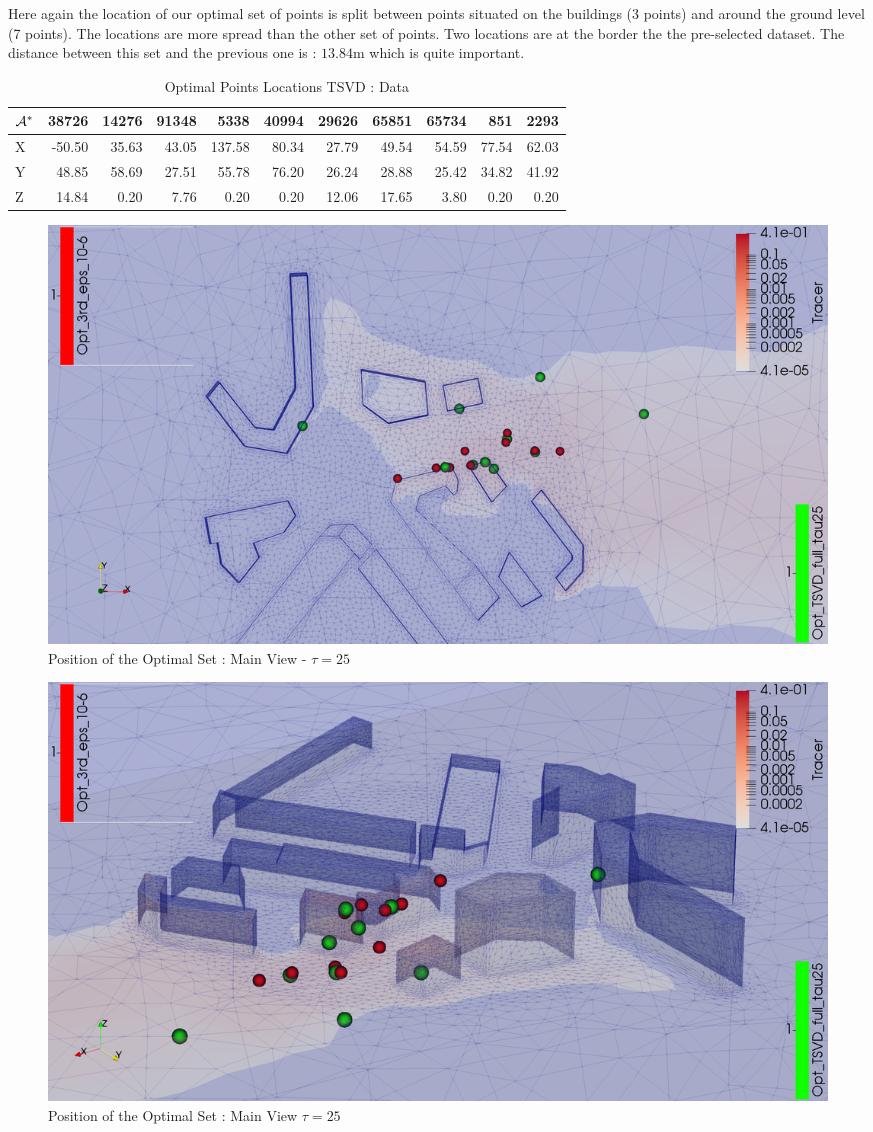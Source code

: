 Here again the location of our optimal set of points is split between points situated on the buildings (3 points) and around the ground level (7 points). The locations are more spread than the other set of points. Two locations are at the border the the pre-selected dataset. The distance between this set and the previous one is : $13.84$m which is quite important.  \\ 



\begin{table}[h]
\centering
\footnotesize
\begin{tabular}{l|rrrrrrrrrr}
\toprule
$\mathcal{A}^*$ &  38726 &  14276 &  91348 &  5338  &  40994 &  29626 &  65851 &  65734 &  851   &  2293  \\
\midrule
X & -50.50 &  35.63 &  43.05 & 137.58 &  80.34 &  27.79 &  49.54 &  54.59 &  77.54 &  62.03 \\
Y &  48.85 &  58.69 &  27.51 &  55.78 &  76.20 &  26.24 &  28.88 &  25.42 &  34.82 &  41.92 \\
Z &  14.84 &   0.20 &   7.76 &   0.20 &   0.20 &  12.06 &  17.65 &   3.80 &   0.20 &   0.20 \\
\bottomrule
\end{tabular}
\caption{Optimal Points Locations TSVD : Data}
\label{tab:tsvd:data}
\end{table}


\begin{figure}[h!]
\centering
\includegraphics[width=0.7\linewidth]{figures/MainOptimTSVD/tsvd+3rd_position_top}
\caption{Position of the Optimal Set : Main View - $\tau = 25$}
\label{fig:full_set_tsvd:position:top}
\end{figure}

\begin{figure}[h!]
\centering
\includegraphics[width=0.7\linewidth]{figures/MainOptimTSVD/tsvd+3rd_position_side}
\caption{Position of the Optimal Set : Main View $\tau = 25$}
\label{fig:full_set_tsvd:position:zoom}
\end{figure}







